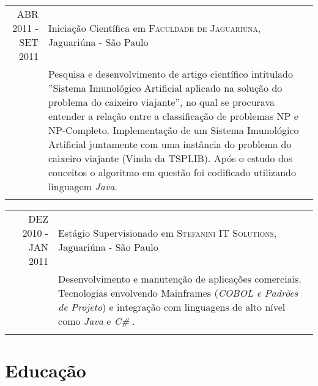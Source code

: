 \documentclass[a4paper,10pt]{article} %
\begin{document}
\begin{samepage}
\begin{tabular}{r|p{11cm}}

\textsc{ABR 2011 - SET 2011} & Iniciação Científica em \textsc{Faculdade de Jaguariúna}, Jaguariúna - São Paulo \emph{}\\
                           & \footnotesize{Pesquisa e desenvolvimento de artigo científico intitulado ''Sistema Imunológico Artificial aplicado na solução do problema do caixeiro viajante'', no qual se procurava entender a relação entre a classificação de problemas NP e NP-Completo. Implementação de um Sistema Imunológico Artificial juntamente com uma instância do problema do caixeiro viajante (Vinda da TSPLIB). Após o estudo dos conceitos o algoritmo em questão foi codificado utilizando linguagem \textit{Java}.}\\
\multicolumn{2}{c}{} \\

\end{tabular}
\end{samepage}

\begin{tabular}{r|p{11cm}}

\textsc{DEZ 2010 - JAN 2011} & Estágio Supervisionado em \textsc{Stefanini IT Solutions}, Jaguariúna - São Paulo \emph{}\\
                           & \footnotesize{Desenvolvimento e manutenção de aplicações comerciais. Tecnologias envolvendo Mainframes (\emph{COBOL e Padrões de Projeto}) e integração com linguagens de alto nível como \textit{Java} e \textit{ C\# }.}\\
\multicolumn{2}{c}{} \\
\end{tabular}


\section{Educação}
\end{document}
